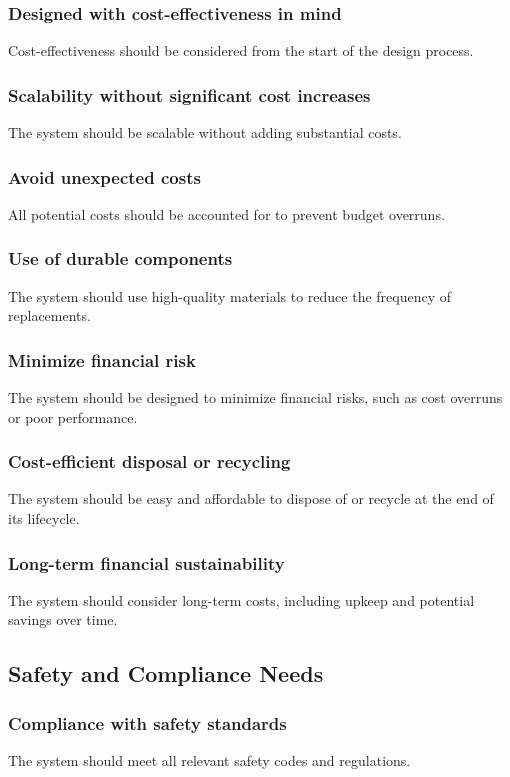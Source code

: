 \documentclass[12pt]{report}
\begin{document}
\subsubsection{Designed with cost-effectiveness in mind}
Cost-effectiveness should be considered from the start of the design process.

\subsubsection{Scalability without significant cost increases}
The system should be scalable without adding substantial costs.

\subsubsection{Avoid unexpected costs}
All potential costs should be accounted for to prevent budget overruns.

\subsubsection{Use of durable components}
The system should use high-quality materials to reduce the frequency of replacements.

\subsubsection{Minimize financial risk}
The system should be designed to minimize financial risks, such as cost overruns or poor performance.

\subsubsection{Cost-efficient disposal or recycling}
The system should be easy and affordable to dispose of or recycle at the end of its lifecycle.

\subsubsection{Long-term financial sustainability}
The system should consider long-term costs, including upkeep and potential savings over time.

\newpage
\subsection{Safety and Compliance Needs}

\subsubsection{Compliance with safety standards}
The system should meet all relevant safety codes and regulations.
\end{document}
